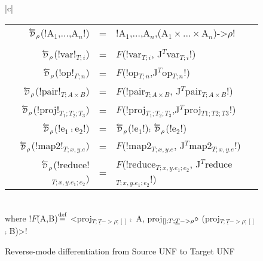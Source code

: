 \begin{figure*}[t]
\begin{tabular}{|c|}
\hline
    \begin{tabular}{r c l}
    $\Dsynrevsymbol_{\rho}$(!A$_1$,$\ldots$,A$_n$!) &=& !A$_1$,$\ldots$,A$_n$,(A$_1\times\ldots\times$A$_n$)->$\rho$!\\ \\
    $\Dsynrevsymbol_{\rho}$(!var!$_{T;i}$) &=& $F$(!var$_{T;i}$, J$^T$var$_{T;i}$!) \\
    $\Dsynrevsymbol_{\rho}$(!op!$_{\Gamma;n}$) &=& $F$(!op$_{T;n}$,J$^T$op$_{T;n}$!) \\ 
    $\Dsynrevsymbol_{\rho}$(!pair!$_{T;A\times B}$) &=& $F$(!pair$_{T;A\times B}$, J$^T$pair$_{T;A\times B}$!) \\
    $\Dsynrevsymbol_{\rho}$(!proj!$_{T_1;T_2;T_3}$) &=& $F$(!proj$_{T_1;T_2;T_3}$,J$^T$proj$_{T1;T2;T3}$!) \\
    $\Dsynrevsymbol_{\rho}$(!e$_1\comp$e$_2$!) &=& $\Dsynrevsymbol_{\rho}$(!e$_1$!)$\comp$ $\Dsynrevsymbol_{\rho}$(!e$_2$!)\\ 
    $\Dsynrevsymbol_{\rho}$(!map2!$_{T;x,y.e}$) &=& $F$(!map2$_{T;x,y.e}$, J$^T$map2$_{T;x,y.e}$!) \\
    $\Dsynrevsymbol_{\rho}$(!reduce!$_{T;x,y.e_1;e_2}$) &=& $F$(!reduce$_{T;x,y.e_1;e_2}$, J$^T$reduce$_{T;x,y.e_1;e_2}$!) \\
    \end{tabular}\\
    where !$F$(A,B)$\stackrel {\mathrm{def}}=$ <proj$_{T;\underline{T}->\rho;[]} \comp$ A, proj$_{[];T;\underline{T}->\rho} \circ$ (proj$_{T;\underline{T}->\rho;[]}$ $\comp$ B)>!\\\hline
    \end{tabular}
    \vspace{-0.4cm}
    \caption{Reverse-mode differentiation from Source UNF to Target UNF}
    \label{fig:diff_macro}    
    \vspace{-0.4cm}
\end{figure*}